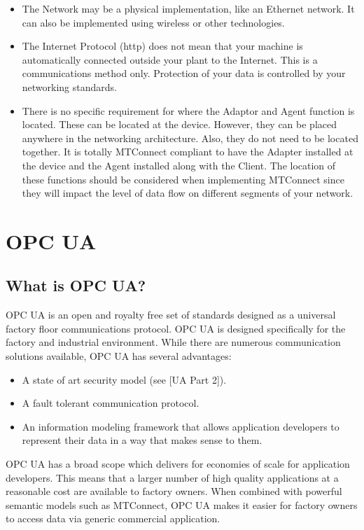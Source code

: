 \documentclass{mtconnect}	%
\begin{document}
\begin{itemize}
\item The Network may be a physical implementation, like an Ethernet network. It can also be implemented using wireless or other technologies.
\item The Internet Protocol (http) does not mean that your machine is automatically connected outside your plant to the Internet. This is a communications method only. Protection of your data is controlled by your networking standards. 
\item There is no specific requirement for where the Adaptor and Agent function is located. These can be located at the device. However, they can be placed anywhere in the networking architecture. Also, they do not need to be located together. It is totally MTConnect compliant to have the Adapter installed at the device and the Agent installed along with the Client. The location of these functions should be considered when implementing MTConnect since they will impact the level of data flow on different segments of your network.
\end{itemize}

\section{OPC UA}

\subsection{What is OPC UA?}

OPC UA is an open and royalty free set of standards designed as a universal factory floor communications protocol.
OPC UA is designed specifically for the factory and industrial environment. While there are numerous communication solutions available, OPC UA has several advantages:

\begin{itemize}
\item A state of art security model (see [UA Part 2]).
\item A fault tolerant communication protocol.
\item An information modeling framework that allows application developers to represent their data in a way that makes sense to them.
\end{itemize}

OPC UA has a broad scope which delivers for economies of scale for application developers. This means that a larger number of high quality applications at a reasonable cost are available to factory owners. When combined with powerful semantic models such as MTConnect, OPC UA makes it easier for factory owners to access data via generic commercial application.
\end{document}
